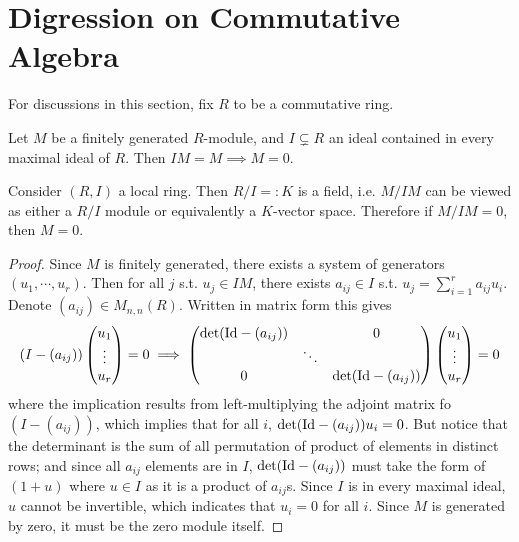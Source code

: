 \section{Digression on Commutative Algebra}

For discussions in this section, fix $R$ to be a commutative ring.

\begin{lemma}\label{lem:Nakayama}
    Let $M$ be a finitely generated $R$-module, and $I\subsetneq R$ an ideal contained in every maximal ideal of $R$. Then $IM = M\implies M = 0$.
\end{lemma}

\begin{remark}
    Consider $(R, I)$ a local ring. Then $R/I =: K$ is a field, i.e. $M/IM$ can be viewed as either a $R/I$ module or equivalently a $K$-vector space. Therefore if $M/IM = 0$, then $M = 0$.
\end{remark}

\begin{proof}
    Since $M$ is finitely generated, there exists a system of generators $(u_1, \cdots, u_r)$. Then for all $j$ s.t. $u_j\in IM$, there exists $a_{ij}\in I$ s.t. $u_j = \sum\limits_{i=1}^r a_{ij} u_i$. Denote $(a_{ij})\in M_{n, n}(R)$. Written in matrix form this gives 
    \[
        (I - (a_{ij}))\begin{pmatrix} u_1\\ \vdots \\ u_r \end{pmatrix} = 0 \implies \begin{pmatrix}
            \det(\mathrm{Id} - (a_{ij})) & & 0 \\
            & \ddots & \\
            0 & & \det(\mathrm{Id} - (a_{ij}))
        \end{pmatrix}\begin{pmatrix}
            u_1 \\ \vdots \\ u_r
        \end{pmatrix} = 0
    \]
    where the implication results from left-multiplying the adjoint matrix fo $ (I - (a_{ij}))$, which implies that for all $i$, $\det(\mathrm{Id} - (a_{ij})) u_i = 0$. But notice that the determinant is the sum of all permutation of product of elements in distinct rows; and since all $a_{ij}$ elements are in $I$, $\det(\mathrm{Id} - (a_{ij}))$ must take the form of $(1 + u)$ where $u\in I$ as it is a product of $a_{ij}$s. Since $I$ is in every maximal ideal, $u$ cannot be invertible, which indicates that $u_i = 0$ for all $i$. Since $M$ is generated by zero, it must be the zero module itself. 
\end{proof}

